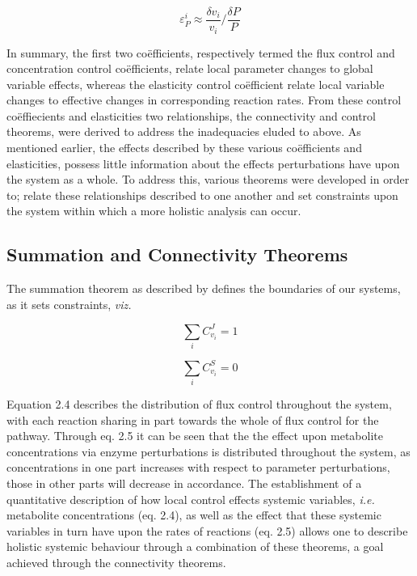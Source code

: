 \begin{equation}
\varepsilon^{i}_{P}\approx\dfrac{\delta v_{i}}{v_{i}}/\dfrac{\delta P}{P}
\end{equation}

In summary, the first two co\"efficients, respectively termed the flux control and concentration control co\"efficients, relate local parameter changes to global variable effects, whereas the elasticity control co\"efficient relate local variable changes to effective changes in corresponding reaction rates. From these control co\"effiecients and elasticities two relationships, the connectivity and control theorems, were derived to address the inadequacies eluded to above. As mentioned earlier, the effects described by these various co\"efficients and elasticities, possess little information about the effects perturbations have upon the system as a whole. To address this, various theorems were developed in order to; relate these relationships described to one another and  set constraints upon the system within which a more holistic analysis can occur.

\subsection{Summation and Connectivity Theorems}

The summation theorem as described by \citeauthor{Kacser1979,Rapoport1974} defines the boundaries of our systems, as it sets constraints, \textit{viz.} 

\begin{equation}
\sum_{i}C_{v_i}^J=1
\end{equation}

\begin{equation}
\sum_{i}C_{v_i}^S=0
\end{equation}

Equation 2.4 describes the distribution of flux control throughout the system, with each reaction sharing in part towards the whole of flux control for the pathway. Through eq. 2.5 it can be seen that the the effect upon metabolite concentrations via enzyme perturbations is distributed throughout the system, as concentrations in one part increases with respect to parameter perturbations, those in other parts will decrease in accordance. The establishment of a quantitative description of how local control effects systemic variables, \textit{i.e.} metabolite concentrations (eq. 2.4), as well as the effect that these systemic variables in turn have upon the rates of reactions (eq. 2.5) allows one to describe holistic systemic behaviour through a combination of these theorems, a goal achieved through the connectivity theorems.

